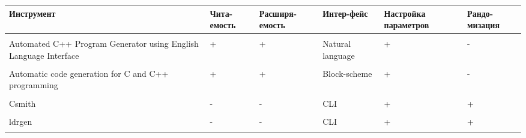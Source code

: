 \begin{table}[ht]
\begin{tabular}{p{5.1em}|m{4em}m{5em}m{4em}m{4em}m{4em}}
    Инструмент                                                       & Чита-\newline емость & Расширя-\newline емость & Интер-\newline фейс & Настройка параметров & Рандо-\newline мизация \\
    \hline                                                                                                                                                                                  \\
    Automated C++ Program Generator using English Language Interface & +                    & +                       & Natural language    & +                    & -                      \\
    \hline                                                                                                                                                                                  \\
    Automatic code generation for C and C++ programming              & +                    & +                       & Block-scheme        & +                    & -                      \\
    \hline                                                                                                                                                                                  \\
    Csmith                                                           & -                    & -                       & CLI                 & +                    & +                      \\
    \hline                                                                                                                                                                                  \\
    ldrgen                                                           & -                    & -                       & CLI                 & +                    & +                      \\
    \hline                                                                                                                                                                                  \\

\end{tabular}
\end{table}
